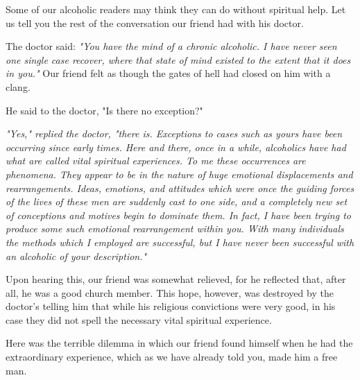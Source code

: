 \begin{biblechapter}
    Some of our alcoholic readers may think 
    they can do without spiritual help. 
\verse Let us tell you the rest of the conversation our friend had 
    with his doctor.

\verse The doctor said: \emph{
"You have the mind of a chronic alcoholic. 
\verse I have never seen one single case recover, 
    where that state of mind existed to the extent that it does in you." 
}
\verse Our friend felt as though 
    the gates of hell had closed on him with a clang.

\verse He said to the doctor, "Is there no exception?"

\emph{
\verse "Yes," replied the doctor, 
    "there is. 
\verse Exceptions to cases such as yours 
    have been occurring since early times. 
\verse Here and there, once in a while, 
    alcoholics have had what are called vital spiritual experiences. 
\verse To me these occurrences are phenomena. 
\verse They appear to be in the nature of 
    huge emotional displacements and rearrangements. 
\verse Ideas, emotions, and attitudes 
    which were once the guiding forces of the lives of these men 
    are suddenly cast to one side, 
    and a completely new set of conceptions and motives 
    begin to dominate them. 
\verse In fact, I have been trying to produce 
    some such emotional rearrangement within you. 
\verse With many individuals the methods which I employed are successful, 
    but I have never been successful with an alcoholic of your description."
}

\verse Upon hearing this, 
    our friend was somewhat relieved, 
    for he reflected that, after all, 
    he was a good church member. 
\verse This hope, however, was destroyed 
    by the doctor's telling him 
    that while his religious convictions were very good, 
    in his case they did not spell the necessary vital spiritual experience.

\verse Here was the terrible dilemma 
    in which our friend found himself 
    when he had the extraordinary experience, 
    which as we have already told you, made him a free man.
\end{biblechapter}


